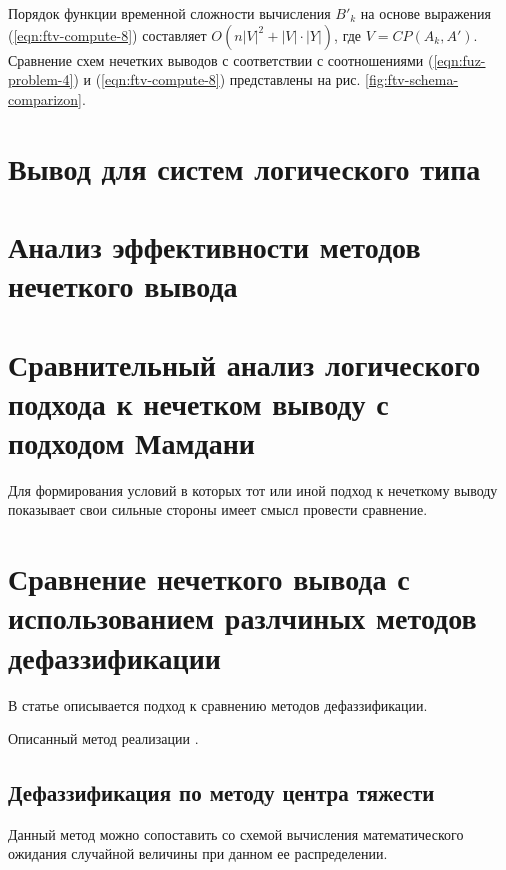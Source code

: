 Порядок функции временной сложности вычисления $B'_k$ на основе выражения (\ref{eqn:ftv-compute-8}) составляет $O\left(n|V|^2+|V|\cdot |Y|\right)$, где $V=CP(A_k, A')$. Сравнение схем нечетких выводов с соответствии с соотношениями (\ref{eqn:fuz-problem-4}) и (\ref{eqn:ftv-compute-8}) представлены на рис. \cref{fig:ftv-schema-comparizon}.

\section{Вывод для систем логического типа}




\section{Анализ эффективности методов нечеткого вывода}

\section{Сравнительный анализ логического подхода к нечетком выводу с подходом Мамдани}

Для формирования условий  в которых тот или иной подход к нечеткому выводу показывает  свои сильные стороны имеет смысл провести сравнение.

\section{Сравнение нечеткого вывода с использованием разлчиных методов дефаззификации}

В статье \cite{LEEKWIJCK1999159} описывается подход к сравнению методов дефаззификации.

Описанный метод реализации \cite{eisele1994}.

\subsection{Дефаззификация по методу центра тяжести}

Данный метод можно сопоставить со схемой вычисления математического ожидания случайной величины при данном ее распределении.

